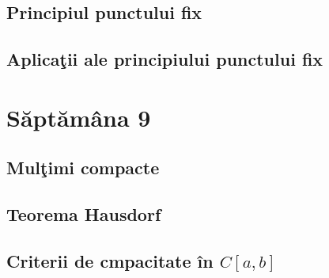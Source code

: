 \documentclass[a4paper,12pt]{article}
\theoremstyle{change}
\begin{document}
\subsection{Principiul punctului fix}

\subsection{Aplicaţii ale principiului  punctului fix}

\section{Săptămâna 9}


\subsection{Mulţimi compacte}

\subsection{Teorema Hausdorf}


\subsection{Criterii de cmpacitate în $C[a,b]$}
\end{document}
